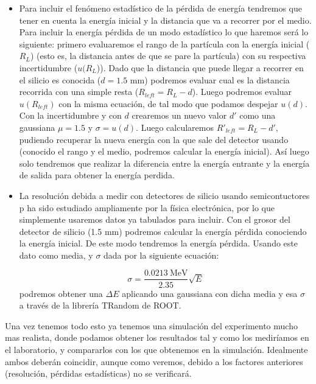 \documentclass[12pt,a4paper]{article}
\numberwithin{equation}{section}
\numberwithin{figure}{section}
\begin{document}
\begin{itemize}
    \item Para incluir el fenómeno estadístico de la pérdida de energía tendremos que tener en cuenta la energía inicial y la distancia que va a recorrer por el medio. Para incluir la energía pérdida de un modo estadístico lo que haremos será lo siguiente: primero evaluaremos el rango de la partícula con la energía inicial ($R_L$) (esto es, la distancia antes de que se pare la partícula) con su respectiva incertidumbre ($u(R_L$)). Dado que la distancia que puede llegar a recorrer en el silicio es conocida ($d=1.5$ mm) podremos evaluar cual es la distancia recorrida con una simple resta ($R_{left}=R_L-d$). Luego podremos evaluar $u(R_{left})$ con la misma ecuación, de tal modo que podamos despejar $u(d)$. Con la incertidumbre y con $d$ crearemos un nuevo valor $d'$ como una gaussiana $\mu=1.5$ y $\sigma=u(d)$. Luego calcularemos $R'_{left}=R_{L}-d'$, pudiendo recuperar la nueva energía con la que sale del detector usando (conocido el rango y el medio, podremos calcular la energía inicial). Así luego solo tendremos que realizar la diferencia entre la energía entrante y la energía de salida para obtener la energía perdida. 
    
    \item La resolución debida a medir con detectores de silicio usando semicontuctores p ha sido estudiado ampliamente por la física electrónica, por lo que simplemente usaremos datos ya tabulados para incluir. Con el grosor del detector de silicio (1.5 mm) podremos calcular la energía pérdida conociendo la energía inicial. De este modo tendremos la energía pérdida. Usando este dato como media, y $\sigma$ dada por la siguiente ecuación: 
    
    \begin{equation}
        \sigma = \frac{0.0213 \  \text{MeV}}{2.35} \sqrt{E}
    \end{equation}
    podremos obtener una $\Delta E$ aplicando una gaussiana con dicha media y esa $\sigma$ a través de la librería TRandom de ROOT. 

\end{itemize}

Una vez tenemos todo esto ya tenemos una simulación del experimento mucho mas realista, donde podamos obtener los resultados tal y como los mediríamos en el laboratorio, y compararlos con los que obtenemos en la simulación. Idealmente ambos deberán coincidir, aunque como veremos, debido a los factores anteriores (resolución, pérdidas estadísticas) no se verificará. 
\end{document}
